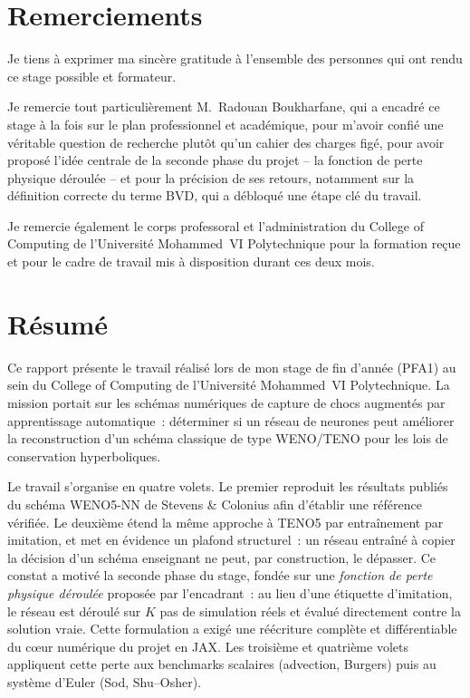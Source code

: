 \documentclass[12pt,a4paper,oneside]{report}
\begin{document}
\setcounter{page}{1}
\pagestyle{plain}

\chapter*{Remerciements}

Je tiens à exprimer ma sincère gratitude à l'ensemble des personnes qui ont
rendu ce stage possible et formateur.

Je remercie tout particulièrement M.~Radouan Boukharfane, qui a encadré ce
stage à la fois sur le plan professionnel et académique, pour m'avoir confié
une véritable question de recherche plutôt qu'un cahier des charges figé, pour
avoir proposé l'idée centrale de la seconde phase du projet -- la fonction de
perte physique déroulée -- et pour la précision de ses retours, notamment sur
la définition correcte du terme BVD, qui a débloqué une étape clé du travail.

Je remercie également le corps professoral et l'administration du College of
Computing de l'Université Mohammed~VI Polytechnique pour la formation reçue et
pour le cadre de travail mis à disposition durant ces deux mois.

\chapter*{Résumé}

Ce rapport présente le travail réalisé lors de mon stage de fin d'année (PFA1)
au sein du College of Computing de l'Université Mohammed~VI Polytechnique. La
mission portait sur les schémas numériques de capture de chocs augmentés par
apprentissage automatique~: déterminer si un réseau de neurones peut améliorer
la reconstruction d'un schéma classique de type WENO/TENO pour les lois de
conservation hyperboliques.

Le travail s'organise en quatre volets. Le premier reproduit les résultats
publiés du schéma WENO5-NN de Stevens \& Colonius afin d'établir une référence
vérifiée. Le deuxième étend la même approche à TENO5 par entraînement par
imitation, et met en évidence un plafond structurel~: un réseau entraîné à
copier la décision d'un schéma enseignant ne peut, par construction, le
dépasser. Ce constat a motivé la seconde phase du stage, fondée sur une
\emph{fonction de perte physique déroulée} proposée par l'encadrant~: au lieu
d'une étiquette d'imitation, le réseau est déroulé sur $K$ pas de simulation
réels et évalué directement contre la solution vraie. Cette formulation a exigé
une réécriture complète et différentiable du cœur numérique du projet en JAX.
Les troisième et quatrième volets appliquent cette perte aux benchmarks
scalaires (advection, Burgers) puis au système d'Euler (Sod, Shu--Osher).
\end{document}
